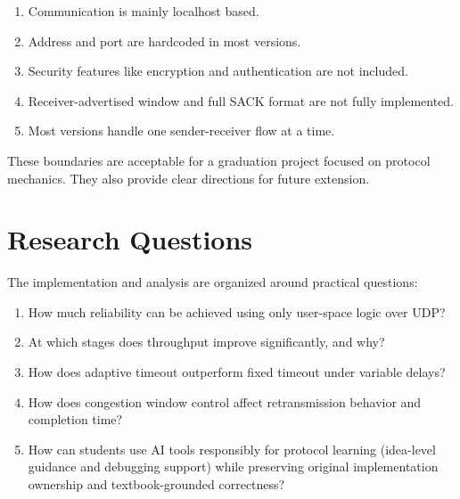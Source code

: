 \begin{enumerate}
	\item Communication is mainly localhost based.
	\item Address and port are hardcoded in most versions.
	\item Security features like encryption and authentication are not
	included.
	\item Receiver-advertised window and full SACK format are not fully
	implemented.
	\item Most versions handle one sender-receiver flow at a time.
\end{enumerate}

These boundaries are acceptable for a graduation project focused on protocol
mechanics. They also provide clear directions for future extension.

\section{Research Questions}
The implementation and analysis are organized around practical questions:

\begin{enumerate}
	\item How much reliability can be achieved using only user-space logic over
	UDP?
	\item At which stages does throughput improve significantly, and why?
	\item How does adaptive timeout outperform fixed timeout under variable
	delays?
	\item How does congestion window control affect retransmission behavior and
	completion time?
	\item How can students use AI tools responsibly for protocol learning
	(idea-level guidance and debugging support) while preserving original
	implementation ownership and textbook-grounded correctness?
\end{enumerate}